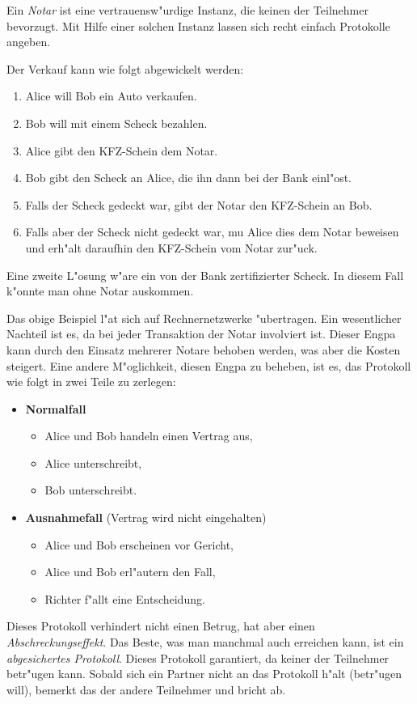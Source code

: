 Ein {\em Notar} ist eine vertrauensw"urdige Instanz, die keinen der
Teilnehmer bevorzugt. Mit Hilfe einer solchen Instanz lassen sich recht einfach
Protokolle angeben.

\begin{beispiel} 
Der Verkauf kann wie folgt abgewickelt werden:
  \begin{enumerate}
    \item Alice will Bob ein Auto verkaufen.
    \item Bob will mit einem Scheck bezahlen.
    \item Alice gibt den KFZ-Schein dem Notar.
    \item Bob gibt den Scheck an Alice, die ihn dann bei der Bank einl"ost.
    \item Falls der Scheck gedeckt war, gibt der Notar den KFZ-Schein an Bob.
    \item Falls aber der Scheck nicht gedeckt war, mu\3 Alice dies dem Notar 
          beweisen und erh"alt daraufhin den KFZ-Schein vom Notar zur"uck.
  \end{enumerate}
Eine zweite L"osung w"are ein von der Bank zertifizierter Scheck. In
diesem Fall k"onnte man ohne Notar auskommen.
\end{beispiel}

Das obige Beispiel l"a\3t sich auf Rechnernetzwerke "ubertragen. Ein
wesentlicher Nachteil ist es, da\3 bei jeder Transaktion der Notar involviert
ist. Dieser Engpa\3 kann durch den Einsatz mehrerer Notare behoben
werden, was aber die Kosten steigert. Eine andere M"oglichkeit, diesen
Engpa\3 zu beheben, ist es, das Protokoll wie folgt in zwei Teile zu
zerlegen:
\begin{itemize}
  \item{\bf Normalfall}
    \begin{itemize}
      \item Alice und Bob handeln einen Vertrag aus,
      \item Alice unterschreibt,
      \item Bob unterschreibt.
    \end{itemize}
  \item{{\bf Ausnahmefall} (Vertrag wird nicht eingehalten)}
    \begin{itemize}
      \item Alice und Bob erscheinen vor Gericht,
      \item Alice und Bob erl"autern den Fall,
      \item Richter f"allt eine Entscheidung.
    \end{itemize}
\end{itemize}
Dieses Protokoll verhindert nicht einen Betrug, hat aber einen {\em
Abschreckungseffekt}. Das Beste, was man manchmal auch erreichen kann,
ist ein {\em abgesichertes Protokoll}. Dieses Protokoll garantiert,
da\3 keiner der Teilnehmer betr"ugen kann. Sobald sich ein Partner
nicht an das Protokoll h"alt (betr"ugen will), bemerkt das der andere
Teilnehmer und bricht ab.

